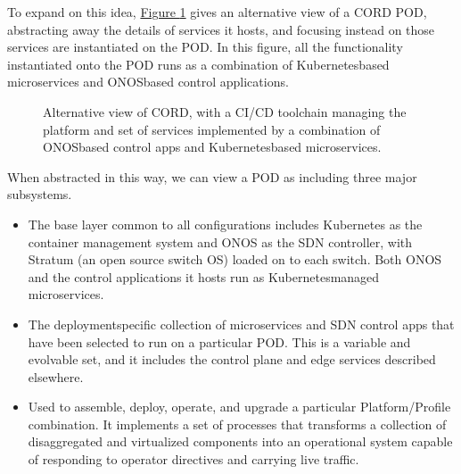 \documentclass[a4paper,11pt,english]{sphinxmanual}
\let\sphinxpxdimen\pdfpxdimen\else\newdimen\sphinxpxdimen
\begin{document}
\sphinxAtStartPar
To expand on this idea, \hyperref[\detokenize{impl:fig-ci-cd}]{Figure \ref{\detokenize{impl:fig-ci-cd}}} gives an
alternative view of a CORD POD, abstracting away the details of 
services it hosts, and focusing instead on  those services are
instantiated on the POD. In this figure, all the functionality
instantiated onto the POD runs as a combination of Kubernetes\sphinxhyphen{}based
microservices and ONOS\sphinxhyphen{}based control applications.

\begin{figure}[ht]
\centering
\capstart

\noindent\sphinxincludegraphics[width=350\sphinxpxdimen]{{Slide26}.png}
\caption{Alternative view of CORD, with a CI/CD toolchain
managing the platform and set of services implemented by a
combination of ONOS\sphinxhyphen{}based control apps and Kubernetes\sphinxhyphen{}based
microservices.}\label{\detokenize{impl:id2}}\label{\detokenize{impl:fig-ci-cd}}\end{figure}

\sphinxAtStartPar
When abstracted in this way, we can view a POD as including three major
subsystems.
\begin{itemize}
\item {} 
\sphinxAtStartPar
{} The base layer common to all configurations includes
Kubernetes as the container management system and ONOS as the SDN
controller, with Stratum (an open source switch OS) loaded on to each switch. Both ONOS and the
control applications it hosts run as Kubernetes\sphinxhyphen{}managed
microservices.

\item {} 
\sphinxAtStartPar
{} The deployment\sphinxhyphen{}specific collection of microservices and
SDN control apps that have been selected to run on a particular POD.
This is a variable and evolvable set, and it includes the control
plane and edge services described elsewhere.

\item {} 
\sphinxAtStartPar
{} Used to assemble, deploy, operate, and upgrade a
particular Platform/Profile combination. It implements a set of
processes that transforms a collection of disaggregated and
virtualized components into an operational system capable of
responding to operator directives and carrying live traffic.

\end{itemize}
\end{document}
